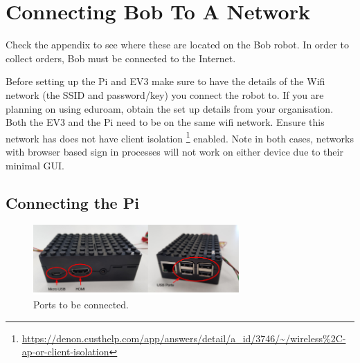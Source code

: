 \documentclass[onecolumn]{IEEEtran}
\begin{document}
\section{Connecting Bob To A Network}
Check the appendix to see where these are located on the Bob robot.\n
In order to collect orders, Bob must be connected to the Internet. 
\par Before setting up the Pi and EV3 make sure to have the details of the Wifi network (the SSID and password/key) you connect the robot to. If you are planning on using eduroam, obtain the set up details from your organisation. Both the EV3 and the Pi need to be on the same wifi network. Ensure this network has does not have client isolation
\footnote{\url{https://denon.custhelp.com/app/answers/detail/a_id/3746/~/wireless\%2C-ap-or-client-isolation}} 
enabled. Note in both cases, networks with browser based sign in processes will not work on either device due to their minimal GUI. 

\subsection{Connecting the Pi}
\begin{figure}[H]
    \begin{center}
    \includegraphics[width=0.7\textwidth]{pi-port.png}
    \caption{Ports to be connected.}
    \label{fig: figure}
    \end{center}
\end{figure}
\end{document}
